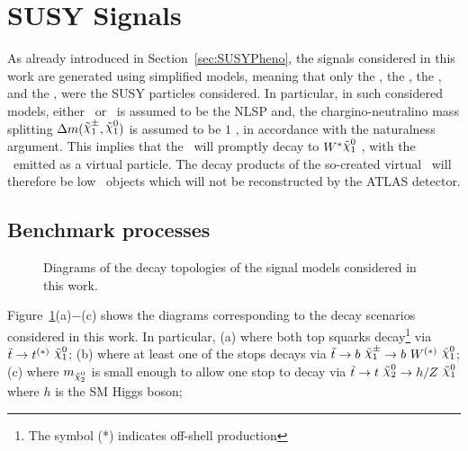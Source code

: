 	\section{SUSY Signals}
	\label{sec:susysig}

		As already introduced in Section~\ref{sec:SUSYPheno}, the signals considered in this work are generated using simplified models, meaning that only the \stop, the \ninoone, the \ninotwo, and the \chinoonepm, were the \ac{SUSY} particles considered. In particular, in such considered models, either \ninotwo\ or \chinoonepm\ is assumed to be the \ac{NLSP} and, the chargino-neutralino mass splitting $\Delta m(\chinoonepm, \ninoone)$ is assumed to be $1$ \GeV, in accordance with the naturalness argument. This implies that the \chinoonepm\ will promptly decay to $\Wboson^*\ninoone$ , with the \Wboson\ emitted as a virtual particle. The decay products of the so-created virtual \Wboson\ will therefore be low \pt\ objects which will not be reconstructed by the \ac{ATLAS} detector. 

		\subsection{Benchmark processes}

			\begin{figure}[!htb]
				\centering
					\hspace{0.05\textwidth}
					\hspace{0.05\textwidth}
					\hspace{0.05\textwidth}
				\caption{Diagrams of the decay topologies of the signal models considered in this work.}
				\label{fig:stopModels}
			\end{figure}

			Figure~\ref{fig:stopModels}(a)$-$(c) shows the diagrams corresponding to the decay scenarios considered in this work. In particular, (a) where both top squarks decay\footnote{The symbol (*) indicates off-shell production} via $\stop\rightarrow t^{(*)}\ \ninoone$; (b) where at least one of the stops decays via $\stop\rightarrow b\ \chinoonepm \rightarrow b\ \Wboson^{(*)}\ \ninoone$; (c) where $m_{\ninotwo}$ is small enough to allow one stop to decay via $\stop\to t\ \ninotwo \to h/Z\ \ninoone$ where $h$ is the \ac{SM} Higgs boson;

